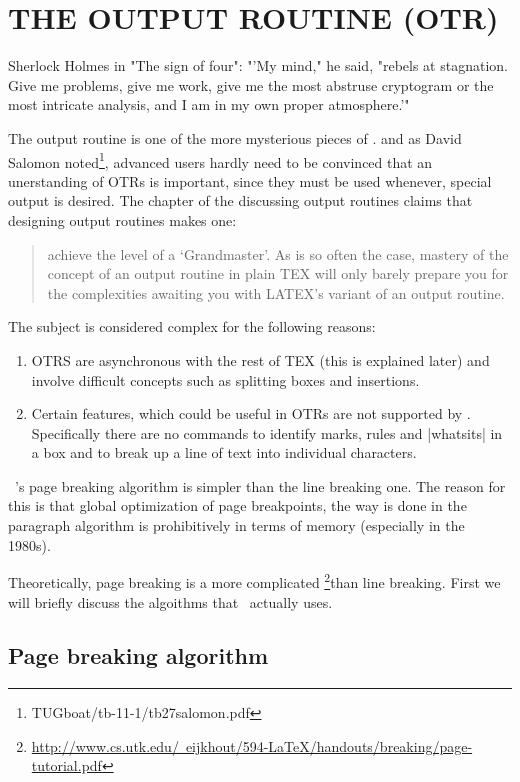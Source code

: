 \chapter{THE OUTPUT ROUTINE (OTR)}

\epigraph{Sherlock Holmes in "The sign of four": "'My mind," he said, "rebels at stagnation. Give me problems, give me work, give me the most abstruse cryptogram or the most intricate analysis, and I am in my own proper atmosphere.'" }{}
\normalsize
The output routine is one of the more mysterious pieces
of \tex.
and as  David Salomon noted\footnote{TUGboat/tb-11-1/tb27salomon.pdf}, advanced users hardly need to be convinced that an unerstanding of OTRs is important, since they must be used whenever, special output is desired.
 The chapter of the \texbook discussing output
routines claims that designing output routines makes one:

\begin{quotation}
achieve the level of a `\tex Grandmaster'.
As is so often the case, mastery of the concept of an
output routine in plain TEX will only barely prepare you
for the complexities awaiting you with LATEX’s variant of
an output routine.
\end{quotation}


The subject is considered complex for the following reasons:

\begin{enumerate}
\item OTRS are asynchronous with the
rest of TEX (this is explained later) and involve difficult concepts such as splitting boxes and insertions.
\item Certain features, which could be useful in OTRs are not supported by \tex. Specifically there are no commands to identify marks, rules and |whatsits| in a box and to break up a line of text into individual characters.
\end{enumerate}

\tex\ 's page breaking algorithm is simpler than the line breaking one. The reason for this is that global optimization
of page breakpoints, the way is done in the paragraph algorithm is prohibitively in terms of memory (especially in the 1980s).

Theoretically, page breaking is a more complicated \footnote{\href{test}{http://www.cs.utk.edu/~eijkhout/594-LaTeX/handouts/breaking/page-tutorial.pdf}}than line breaking. First we will briefly discuss the algoithms that \tex\ actually
uses.


\section{Page breaking algorithm}

